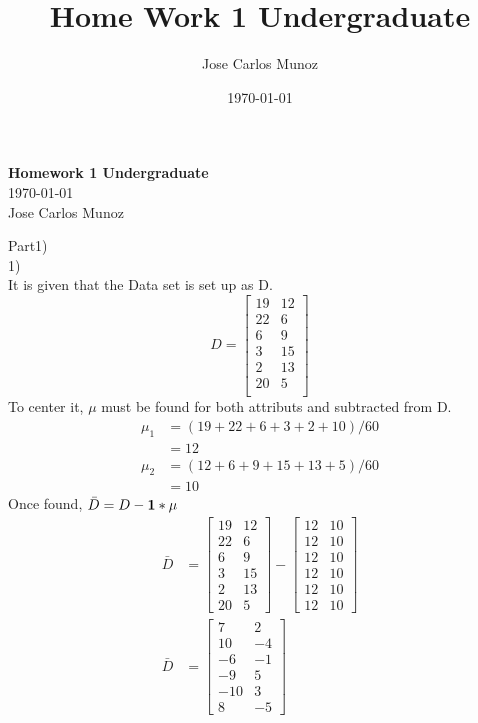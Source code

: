 \documentclass[12pt,english]{article}
\title{Home Work 1 Undergraduate}
\date{\today}
\author{Jose Carlos Munoz}
\begin{document}
\begin{center}
    \Large
    \textbf{Homework 1 Undergraduate}\\
    \small
    \today\\
    \large
    Jose Carlos Munoz
\end{center}
Part1)\\
1)\\
It is given that the Data set is set up as D.\\
\begin{equation*}
D =
\begin{bmatrix}19 & 12 \\22 &  6 \\6  &  9 \\3 &  15 \\2 &  13 \\20 &  5 \\\end{bmatrix}
\end{equation*}
To center it, $\mu$ must be found for both attributs and subtracted from D.
\begin{equation*}
\begin{split}
\mu_{1} &= (19+22+6+3+2+10) / 60\\
 &= 12 \\
\mu_{2} &= (12+6+9+15+13+5) / 60\\
 &= 10
\end{split}
\end{equation*}
Once found, $\bar{D}= D -\bold{1}*\mu$
\begin{equation*}
\begin{split}
\bar{D}&=
\begin{bmatrix}19 & 12 \\22 &  6 \\ 6  &  9 \\ 3 &  15 \\ 2 &  13 \\20 &  5 \end{bmatrix}
-
\begin{bmatrix}12 & 10 \\12 & 10 \\12 & 10 \\12 & 10 \\12 & 10 \\12 & 10 \end{bmatrix}\\
\bar{D}&=
\begin{bmatrix}7 &  2 \\10 & -4 \\-6 & -1 \\-9 &  5 \\-10 &  3 \\8 & -5 \end{bmatrix}
\end{split}
\end{equation*}
\end{document}
